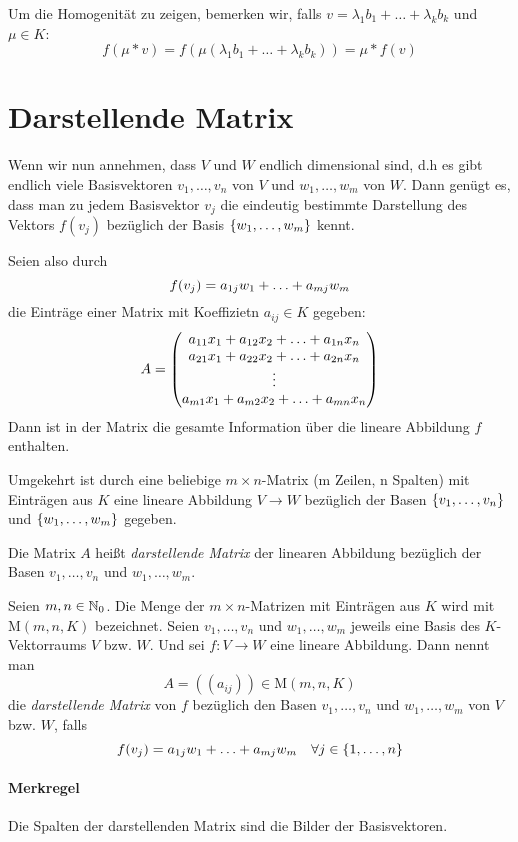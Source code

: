 Um die Homogenität zu zeigen, bemerken wir, falls $v=\lambda_1b_1+\ldots+\lambda_kb_k$ und $\mu\in K$:
\begin{equation*}
  f(\mu*v)=f(\mu(\lambda_1b_1+\ldots+\lambda_kb_k))=\mu*f(v)
\end{equation*}

\section{Darstellende Matrix}
Wenn wir nun annehmen, dass $V$ und $W$ endlich dimensional sind, d.h es gibt endlich viele Basisvektoren $v_1,\ldots,v_n$ von $V$ und $w_1,\ldots,w_m$ von $W$. Dann genügt es, dass man zu jedem Basisvektor $v_j$ die eindeutig bestimmte Darstellung des Vektors $f(v_j)$ bezüglich der Basis $\left\{ w_1,\ldots,w_m \right\}$ kennt.

Seien also durch
\begin{equation*}
  f(v_j) = a_{1j}w_1+\ldots+a_{mj}w_m
\end{equation*}
die Einträge einer Matrix mit Koeffizietn $a_{ij} \in K$ gegeben:
\begin{equation*}
  A=\begin{pmatrix} 
  a_{11}x_1+a_{12}x_2+\ldots+a_{1n}x_n\\
  a_{21}x_1+a_{22}x_2+\ldots+a_{2n}x_n\\
  \vdots\\
  a_{m1}x_1+a_{m2}x_2+\ldots+a_{mn}x_n\\
   \end{pmatrix}
\end{equation*}
Dann ist in der Matrix die gesamte Information über die lineare Abbildung $f$ enthalten.

Umgekehrt ist durch eine beliebige $m\times n$-Matrix (m Zeilen, n Spalten) mit Einträgen aus $K$ eine lineare Abbildung $V\rightarrow W$ bezüglich der Basen $\left\{ v_1,\ldots,v_n \right\}$ und $\left\{ w_1,\ldots,w_m \right\}$ gegeben.

Die Matrix $A$ heißt \emph{darstellende Matrix} der linearen Abbildung bezüglich der Basen $v_1,\ldots,v_n$ und $w_1,\ldots,w_m$.

Seien $m,n\in\mathbb{N}_0$. Die Menge der $m\times n$-Matrizen mit Einträgen aus $K$ wird mit $\mathrm{M}(m,n,K)$ bezeichnet. Seien $v_1,\ldots,v_n$ und $w_1,\ldots,w_m$ jeweils eine Basis des $K$-Vektorraums $V$ bzw. $W$. Und sei $f:V\rightarrow W$ eine lineare Abbildung. Dann nennt man
\begin{equation*}
  A=((a_{ij}))\in \mathrm{M}(m,n,K)
\end{equation*}
die \emph{darstellende Matrix} von $f$ bezüglich den Basen $v_1,\ldots,v_n$ und $w_1,\ldots,w_m$ von $V$ bzw. $W$, falls
\begin{equation*}
  f(v_j) = a_{1j}w_1+\ldots+a_{mj}w_m \quad\forall j\in\left\{ 1,\ldots,n \right\}
\end{equation*}

\paragraph{Merkregel}
Die Spalten der darstellenden Matrix sind die Bilder der Basisvektoren.
